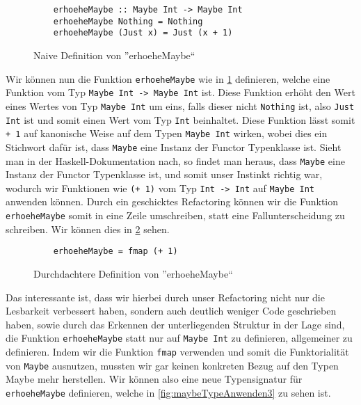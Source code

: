 \documentclass{hhuarticle}
\theoremstyle{definition}
\theoremstyle{theorem}
\begin{document}
  \begin{figure}[h]
    \begin{verbatim}
    erhoeheMaybe :: Maybe Int -> Maybe Int
    erhoeheMaybe Nothing = Nothing
    erhoeheMaybe (Just x) = Just (x + 1)
    \end{verbatim}
    \caption{Naive Definition von ''erhoeheMaybe``}%
    \label{fig:maybeTypeAnwenden1}
  \end{figure}

  Wir können nun die Funktion \verb|erhoeheMaybe| wie in \cref{fig:maybeTypeAnwenden1} definieren, welche
  eine Funktion vom Typ \verb|Maybe Int -> Maybe Int| ist. Diese
  Funktion erhöht den Wert eines Wertes von Typ \verb|Maybe Int| um eins, falls
  dieser nicht \verb|Nothing| ist, also \verb|Just Int| ist und somit
  einen Wert vom Typ \verb|Int| beinhaltet.
  Diese Funktion lässt somit \verb|+ 1| auf kanonische Weise
  auf dem Typen \verb|Maybe Int| wirken, wobei dies ein Stichwort
  dafür ist, dass \verb|Maybe| eine Instanz der Functor
  Typenklasse ist. Sieht man in der Haskell-Dokumentation nach, so findet
  man heraus, dass \verb|Maybe| eine Instanz der Functor Typenklasse ist,
  und somit unser Instinkt richtig war, wodurch wir Funktionen wie \verb|(+ 1)|
  vom Typ \verb|Int -> Int| auf \verb|Maybe Int| anwenden können.
  Durch ein geschicktes Refactoring können wir die Funktion
  \verb|erhoeheMaybe| somit in eine Zeile umschreiben, statt eine
  Fallunterscheidung zu schreiben. Wir können dies in \cref{fig:maybeTypeAnwenden2}
  sehen.

  \begin{figure}[h]
    \begin{verbatim}
    erhoeheMaybe = fmap (+ 1)
    \end{verbatim}
    \caption{Durchdachtere Definition von ''erhoeheMaybe``}%
    \label{fig:maybeTypeAnwenden2}
  \end{figure}

  Das interessante ist, dass wir hierbei durch unser Refactoring nicht
  nur die Lesbarkeit verbessert haben, sondern auch deutlich weniger
  Code geschrieben haben, sowie durch das Erkennen der unterliegenden
  Struktur in der Lage sind, die Funktion \verb|erhoeheMaybe| statt
  nur auf \verb|Maybe Int| zu definieren, allgemeiner zu definieren.
  Indem wir die Funktion \verb|fmap| verwenden und somit die Funktorialität
  von \verb|Maybe| ausnutzen, mussten wir gar keinen konkreten Bezug auf
  den Typen Maybe mehr herstellen. Wir können also eine neue Typensignatur
  für \verb|erhoeheMaybe| definieren, welche in \cref{fig:maybeTypeAnwenden3}
  zu sehen ist.
\end{document}
